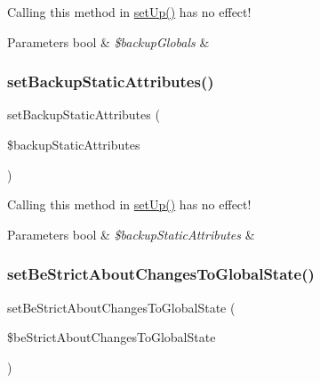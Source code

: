 Calling this method in \mbox{\hyperlink{class_p_h_p_unit___framework___test_case_a0bc688732d2b3b162ffebaf7812e78da}{set\+Up()}} has no effect!


\begin{DoxyParams}[1]{Parameters}
bool & {\em \$backup\+Globals} & \\
\hline
\end{DoxyParams}
\mbox{\label{class_p_h_p_unit___framework___test_case_a7f2ed8943e4b0713c34c9b6e3cf2bea8}} 
\subsubsection{\texorpdfstring{set\+Backup\+Static\+Attributes()}{setBackupStaticAttributes()}}
{\footnotesize\ttfamily set\+Backup\+Static\+Attributes (\begin{DoxyParamCaption}\item[{}]{\$backup\+Static\+Attributes }\end{DoxyParamCaption})}

Calling this method in \mbox{\hyperlink{class_p_h_p_unit___framework___test_case_a0bc688732d2b3b162ffebaf7812e78da}{set\+Up()}} has no effect!


\begin{DoxyParams}[1]{Parameters}
bool & {\em \$backup\+Static\+Attributes} & \\
\hline
\end{DoxyParams}
\mbox{\label{class_p_h_p_unit___framework___test_case_a60888e4ba273ecf8276a846a15a7b183}} 
\subsubsection{\texorpdfstring{set\+Be\+Strict\+About\+Changes\+To\+Global\+State()}{setBeStrictAboutChangesToGlobalState()}}
{\footnotesize\ttfamily set\+Be\+Strict\+About\+Changes\+To\+Global\+State (\begin{DoxyParamCaption}\item[{}]{\$be\+Strict\+About\+Changes\+To\+Global\+State }\end{DoxyParamCaption})}


